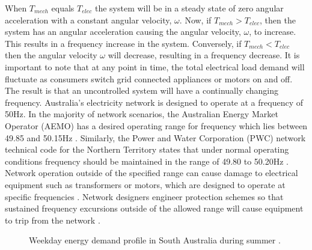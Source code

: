 When $T_{mech}$ equals $T_{elec}$ the system will be in a steady state of zero angular acceleration with a constant angular velocity, $\omega$. Now, if $T_{mech} > T_{elec}$, then the system has an angular acceleration causing the angular velocity, $\omega$, to increase. This results in a frequency increase in the system. Conversely, if $T_{mech} < T_{elec}$ then the angular velocity $\omega$ will decrease, resulting in a frequency decrease. It is important to note that at any point in time, the total electrical load demand will fluctuate as consumers switch grid connected appliances or motors on and off. The result is that an uncontrolled system will have a continually changing frequency. Australia's electricity network is designed to operate at a frequency of 50$\si{\hertz}$. In the majority of network scenarios, the Australian Energy Market Operator (AEMO) has a desired operating range for frequency which lies between 49.85 and 50.15$\si{\hertz}$ \cite{AEMOfreqdev}. Similarly, the Power and Water Corporation (PWC) network technical code for the Northern Territory states that under normal operating conditions frequency should be maintained in the range of 49.80 to 50.20$\si{\hertz}$ \cite{Pwc2013}. Network operation outside of the specified range can cause damage to electrical equipment such as transformers or motors, which are designed to operate at specific frequencies \cite{Sen2014}. Network designers engineer protection schemes so that sustained frequency excursions outside of the allowed range will cause equipment to trip from the network \cite{AEMOpowerfreqriskrev}.

\begin{figure}[ht]
	\centering
	
	\caption[Intraday load demand profile]{Weekday energy demand profile in South Australia during summer \cite{Aemosaenergyrep}.}
	\label{fig:203_load_profile}
\end{figure}

\newpage

